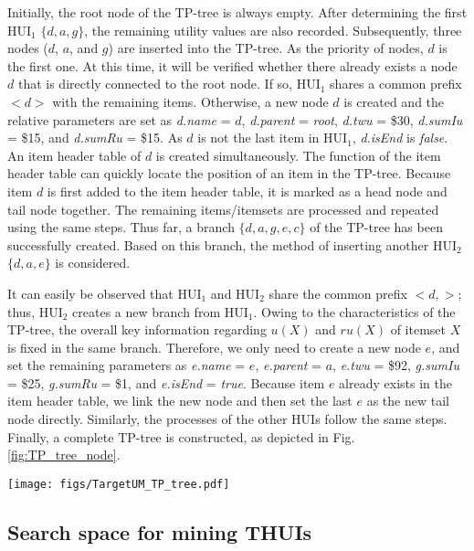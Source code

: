 \documentclass[journal]{IEEEtran}
\begin{document}
Initially, the root node of the TP-tree is always empty. After determining the first HUI$_1$ $\{d, a, g\}$, the remaining utility values are also recorded. Subsequently, three nodes ($d$, $a$, and $g$) are inserted into the TP-tree. As the priority of nodes, $d$ is the first one. At this time, it will be verified whether there already exists a node $d$ that is directly connected to the root node. If so, HUI$_1$ shares a common prefix $<$$d$$>$ with the remaining items. Otherwise, a new node $d$ is created and the relative parameters are set as \textit{d.name} = $d$, \textit{d.parent} = \textit{root}, \textit{d.twu} = \$30, \textit{d.sumIu} = \$15, and \textit{d.sumRu} = \$15. As $d$ is not the last item in HUI$_1$, \textit{d.isEnd} is \textit{false}. An item header table of $d$ is created simultaneously. The function of the item header table can quickly locate the position of an item in the TP-tree. Because item $d$ is first added to the item header table, it is marked as a head node and tail node together. The remaining items/itemsets are processed and repeated using the same steps. Thus far, a branch $\{d, a, g, e, c\}$ of the TP-tree has been successfully created. Based on this branch, the method of inserting another HUI$_2$ $\{d, a, e\}$ is considered.


It can easily be observed that HUI$_1$ and HUI$_2$ share the common prefix $<$$d, $$>$; thus, HUI$_2$ creates a new branch from HUI$_1$. Owing to the characteristics of the TP-tree, the overall key information regarding $u(X)$ and $ru(X)$ of itemset $X$ is fixed in the same branch. Therefore, we only need to create a new node $e$, and set the remaining parameters as \textit{e.name} = $e$, \textit{e.parent} = $a$, \textit{e.twu} = \$92, \textit{g.sumIu} = \$25, \textit{g.sumRu} = \$1, and \textit{e.isEnd} = \textit{true}. Because item $e$ already exists in the item header table, we link the new node and then set the last $e$ as the new tail node directly. Similarly, the processes of the other HUIs follow the same steps. Finally, a complete TP-tree is constructed, as depicted in Fig. \ref{fig:TP_tree_node}.


\begin{figure*}[!htbp]
	\centering
	\texttt{[image: figs/TargetUM\_TP\_tree.pdf]}
	\caption{The constructed TP-tree with $\sigma$ = \$25.}
	\label{fig:TP_tree_node}
\end{figure*}


\subsection{Search space for mining THUIs}
\end{document}
